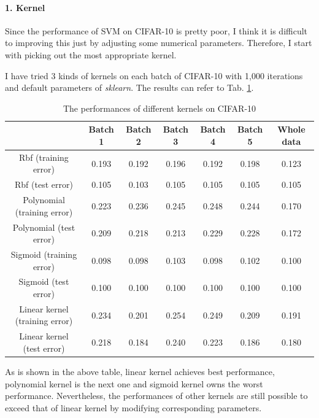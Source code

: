 \documentclass[12pt,a4paper]{article}
\theoremstyle{definition}
\begin{document}
\paragraph{1. Kernel}

\vspace{0.01\linewidth}
Since the performance of SVM on CIFAR-10 is pretty poor, I think it is difficult to improving this just by adjusting some numerical parameters. Therefore, I start with picking out the most appropriate kernel.

\vspace{0.01\linewidth}
I have tried 3 kinds of kernels on each batch of CIFAR-10 with 1,000 iterations and default parameters of \textit{sklearn}. The results can refer to Tab. \ref{tab:bonus-kernel}.

\begin{table}[H]
	\renewcommand\arraystretch{1.5}
	\caption{The performances of different kernels on CIFAR-10}
	\label{tab:bonus-kernel}
	\centering
	
	\begin{tabular}{c|c|c|c|c|c|c}
		\centering
		 & Batch 1 & Batch 2 & Batch 3 & Batch 4 & Batch 5 & Whole data \\
		\hline
		\hline
		
		Rbf (training error) & 0.193 & 0.192 & 0.196 & 0.192 & 0.198 &  0.123 \\
		Rbf (test error) & 0.105 & 0.103 & 0.105 & 0.105 & 0.105 & 0.105 \\
		Polynomial (training error) & 0.223 & 0.236 & 0.245 & 0.248 & 0.244 & 0.170 \\
		Polynomial (test error) & 0.209 & 0.218 & 0.213 & 0.229 & 0.228 & 0.172 \\
		Sigmoid (training error) & 0.098 & 0.098 & 0.103 & 0.098 & 0.102 & 0.100 \\
		Sigmoid (test error) & 0.100 & 0.100 & 0.100 & 0.100 & 0.100 & 0.100 \\
		Linear kernel (training error) & 0.234 & 0.201 & 0.254 & 0.249 & 0.209 & 0.191 \\
		Linear kernel (test error) & 0.218 & 0.184 & 0.240 & 0.223 & 0.186 & 0.180 \\
	\end{tabular}
\end{table}

As is shown in the above table, linear kernel achieves best performance, polynomial kernel is the next one and sigmoid kernel owns the worst performance. Nevertheless, the performances of other kernels are still possible to exceed that of linear kernel by modifying corresponding parameters.
\end{document}

